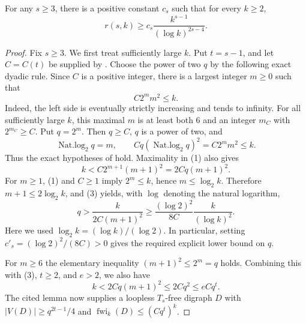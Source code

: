 \begin{theorem}
For any $s\geq3$, there is a positive constant $c_s$ such that for every
$k\geq2$,
\[
 r(s,k)\geq c_s\frac{k^{s-1}}{(\log k)^{2s-4}}.
\]
\end{theorem}
\begin{proof}
Fix $s\geq3$.  We first treat sufficiently large $k$.  Put $t=s-1$, and
let $C=C(t)$ be supplied by .  Choose the power of two
$q$ by the following exact dyadic rule.  Since $C$ is a positive integer,
there is a largest integer $m\geq0$ such that
\[
             C2^m m^2\leq k.                                  \tag{1}
\]
Indeed, the left side is eventually strictly increasing and tends to
infinity.  For all sufficiently large $k$, this maximal $m$ is at least
both $6$ and an integer $m_C$ with $2^{m_C}\geq C$.  Put $q=2^m$.
Then $q\geq C$, $q$ is a power of two, and
\[
\operatorname{Nat.log}_2 q=m,\qquad
 Cq(\operatorname{Nat.log}_2 q)^2=C2^m m^2\leq k.                \tag{2}
\]
Thus the exact hypotheses of  hold.  Maximality in
(1) also gives
\[
 k<C2^{m+1}(m+1)^2=2Cq(m+1)^2.                                \tag{3}
\]
For $m\geq1$, (1) and $C\geq1$ imply $2^m\leq k$, hence
$m\leq\log_2 k$.  Therefore $m+1\leq2\log_2 k$, and (3) yields, with
$\log$ denoting the natural logarithm,
\[
 q>\frac{k}{2C(m+1)^2}
   \geq\frac{(\log 2)^2}{8C}\frac{k}{(\log k)^2}.             \tag{4}
\]
Here we used $\log_2 k=(\log k)/(\log2)$.  In particular, setting
$c'_s=(\log2)^2/(8C)>0$ gives the required explicit lower bound on $q$.

For $m\geq6$ the elementary inequality $(m+1)^2\leq2^m=q$ holds.
Combining this with (3), $t\geq2$, and $e>2$, we also have
\[
 k<2Cq(m+1)^2\leq2Cq^2\leq eCq^t.                            \tag{5}
\]
The cited lemma now supplies a loopless $T_s$-free digraph $D$ with
$|V(D)|\geq q^{2t-1}/4$ and
$\operatorname{fwi}_k(D)\leq(Cq^t)^k$.


\end{proof}
